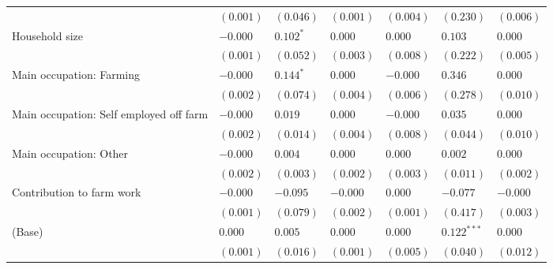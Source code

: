 \begin{tabular}{lllllll}
                                        &   $(0.001)$ &     $(0.046)$ &    $(0.001)$ &     $(0.004)$ &        $(0.230)$ &     $(0.006)$ \\
Household size                          &    $-0.000$ &  $0.102 ^{*}$ &      $0.000$ &       $0.000$ &          $0.103$ &       $0.000$ \\
                                        &   $(0.001)$ &     $(0.052)$ &    $(0.003)$ &     $(0.008)$ &        $(0.222)$ &     $(0.005)$ \\
Main occupation: Farming                &    $-0.000$ &  $0.144 ^{*}$ &      $0.000$ &      $-0.000$ &          $0.346$ &       $0.000$ \\
                                        &   $(0.002)$ &     $(0.074)$ &    $(0.004)$ &     $(0.006)$ &        $(0.278)$ &     $(0.010)$ \\
Main occupation: Self employed off farm &    $-0.000$ &       $0.019$ &      $0.000$ &      $-0.000$ &          $0.035$ &       $0.000$ \\
                                        &   $(0.002)$ &     $(0.014)$ &    $(0.004)$ &     $(0.008)$ &        $(0.044)$ &     $(0.010)$ \\
Main occupation: Other                  &    $-0.000$ &       $0.004$ &      $0.000$ &       $0.000$ &          $0.002$ &       $0.000$ \\
                                        &   $(0.002)$ &     $(0.003)$ &    $(0.002)$ &     $(0.003)$ &        $(0.011)$ &     $(0.002)$ \\
Contribution to farm work               &    $-0.000$ &      $-0.095$ &     $-0.000$ &       $0.000$ &         $-0.077$ &      $-0.000$ \\
                                        &   $(0.001)$ &     $(0.079)$ &    $(0.002)$ &     $(0.001)$ &        $(0.417)$ &     $(0.003)$ \\
(Base)                                  &     $0.000$ &       $0.005$ &      $0.000$ &       $0.000$ &   $0.122 ^{***}$ &       $0.000$ \\
                                        &   $(0.001)$ &     $(0.016)$ &    $(0.001)$ &     $(0.005)$ &        $(0.040)$ &     $(0.012)$ \\
\bottomrule
\end{tabular}
